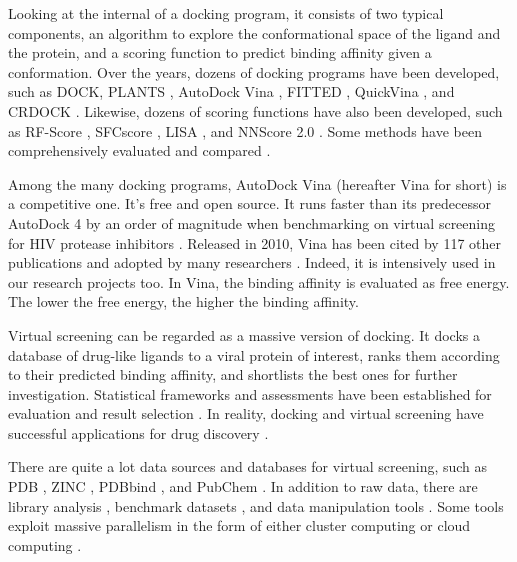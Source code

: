 Looking at the internal of a docking program, it consists of two typical components, an algorithm to explore the conformational space of the ligand and the protein, and a scoring function to predict binding affinity given a conformation. Over the years, dozens of docking programs have been developed, such as DOCK, PLANTS \citep{610,607}, AutoDock Vina \citep{595}, FITTED \citep{602}, QuickVina \citep{1193}, and CRDOCK \citep{1200}. Likewise, dozens of scoring functions have also been developed, such as RF-Score \citep{564}, SFCscore \citep{581}, LISA \citep{775}, and NNScore 2.0 \citep{977}. Some methods have been comprehensively evaluated and compared \citep{637,771,556}.



Among the many docking programs, AutoDock Vina \citep{595} (hereafter Vina for short) is a competitive one. It's free and open source. It runs faster than its predecessor AutoDock 4 \citep{596} by an order of magnitude when benchmarking on virtual screening for HIV protease inhibitors \citep{556}. Released in 2010, Vina has been cited by 117 other publications and adopted by many researchers \citep{609}. Indeed, it is intensively used in our research projects too. In Vina, the binding affinity is evaluated as free energy. The lower the free energy, the higher the binding affinity.%

Virtual screening can be regarded as a massive version of docking. It docks a database of drug-like ligands to a viral protein of interest, ranks them according to their predicted binding affinity, and shortlists the best ones for further investigation. Statistical frameworks and assessments have been established for evaluation and result selection \citep{489,491,769,583,582}. In reality, docking and virtual screening have successful applications for drug discovery \citep{495,498,751,503,752,757,506,738,761,763,766,736}.

There are quite a lot data sources and databases for virtual screening, such as PDB \citep{540,537}, ZINC \citep{532,1178}, PDBbind \citep{529,530}, and PubChem \citep{526}. In addition to raw data, there are library analysis \citep{521}, benchmark datasets \citep{534,533,535,536}, and data manipulation tools \citep{542}. Some tools exploit massive parallelism in the form of either cluster computing or cloud computing \citep{557,773,560,782}.%

